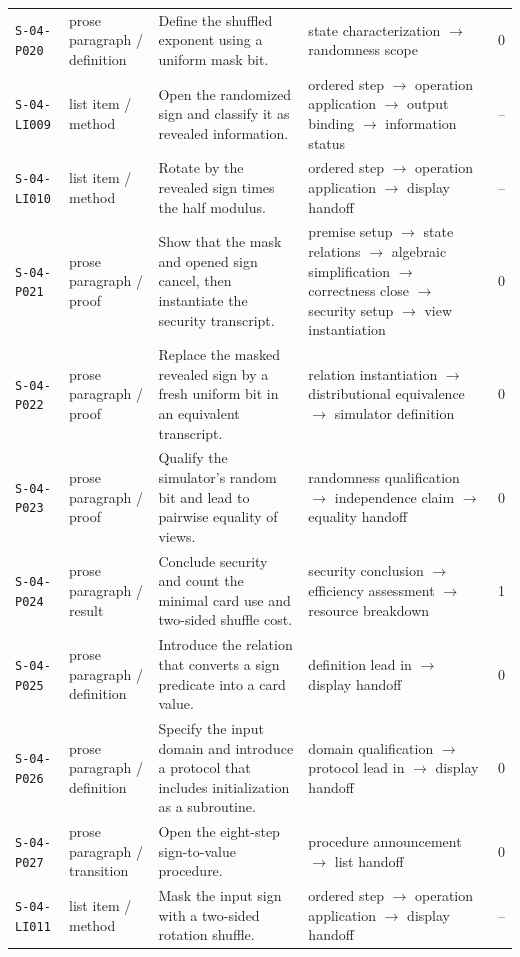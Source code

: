 \documentclass[10pt]{article}
\begin{document}
\begin{longtable}{@{}p{}p{}p{}p{}p{}@{}}
\texttt{S-04-P020}&prose paragraph / definition&Define the shuffled exponent using a uniform mask bit.&state characterization $\rightarrow$ randomness scope&0\\
\texttt{S-04-LI009}&list item / method&Open the randomized sign and classify it as revealed information.&ordered step $\rightarrow$ operation application $\rightarrow$ output binding $\rightarrow$ information status&--\\
\texttt{S-04-LI010}&list item / method&Rotate by the revealed sign times the half modulus.&ordered step $\rightarrow$ operation application $\rightarrow$ display handoff&--\\
\texttt{S-04-P021}&prose paragraph / proof&Show that the mask and opened sign cancel, then instantiate the security transcript.&premise setup $\rightarrow$ state relations $\rightarrow$ algebraic simplification $\rightarrow$ correctness close $\rightarrow$ security setup $\rightarrow$ view instantiation&0\\
\texttt{S-04-P022}&prose paragraph / proof&Replace the masked revealed sign by a fresh uniform bit in an equivalent transcript.&relation instantiation $\rightarrow$ distributional equivalence $\rightarrow$ simulator definition&0\\
\texttt{S-04-P023}&prose paragraph / proof&Qualify the simulator's random bit and lead to pairwise equality of views.&randomness qualification $\rightarrow$ independence claim $\rightarrow$ equality handoff&0\\
\texttt{S-04-P024}&prose paragraph / result&Conclude security and count the minimal card use and two-sided shuffle cost.&security conclusion $\rightarrow$ efficiency assessment $\rightarrow$ resource breakdown&1\\
\texttt{S-04-P025}&prose paragraph / definition&Introduce the relation that converts a sign predicate into a card value.&definition lead in $\rightarrow$ display handoff&0\\
\texttt{S-04-P026}&prose paragraph / definition&Specify the input domain and introduce a protocol that includes initialization as a subroutine.&domain qualification $\rightarrow$ protocol lead in $\rightarrow$ display handoff&0\\
\texttt{S-04-P027}&prose paragraph / transition&Open the eight-step sign-to-value procedure.&procedure announcement $\rightarrow$ list handoff&0\\
\texttt{S-04-LI011}&list item / method&Mask the input sign with a two-sided rotation shuffle.&ordered step $\rightarrow$ operation application $\rightarrow$ display handoff&--\\

\end{longtable}
\end{document}
